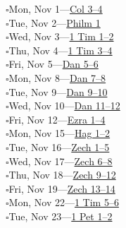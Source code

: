 \hypertarget{rp-2027-11-01}{}\noindent$\square$\enspace Mon, Nov 1\enspace---\enspace \hyperlink{ch-colossians-3}{Col 3--4}\\
\hypertarget{rp-2027-11-02}{}\noindent$\square$\enspace Tue, Nov 2\enspace---\enspace \hyperlink{ch-philemon-1}{Philm 1}\\
\hypertarget{rp-2027-11-03}{}\noindent$\square$\enspace Wed, Nov 3\enspace---\enspace \hyperlink{ch-1timothy-1}{1 Tim 1--2}\\
\hypertarget{rp-2027-11-04}{}\noindent$\square$\enspace Thu, Nov 4\enspace---\enspace \hyperlink{ch-1timothy-3}{1 Tim 3--4}\\
\hypertarget{rp-2027-11-05}{}\noindent$\square$\enspace Fri, Nov 5\enspace---\enspace \hyperlink{ch-daniel-5}{Dan 5--6}\\
\hypertarget{rp-2027-11-08}{}\noindent$\square$\enspace Mon, Nov 8\enspace---\enspace \hyperlink{ch-daniel-7}{Dan 7--8}\\
\hypertarget{rp-2027-11-09}{}\noindent$\square$\enspace Tue, Nov 9\enspace---\enspace \hyperlink{ch-daniel-9}{Dan 9--10}\\
\hypertarget{rp-2027-11-10}{}\noindent$\square$\enspace Wed, Nov 10\enspace---\enspace \hyperlink{ch-daniel-11}{Dan 11--12}\\
\hypertarget{rp-2027-11-12}{}\noindent$\square$\enspace Fri, Nov 12\enspace---\enspace \hyperlink{ch-ezra-1}{Ezra 1--4}\\
\hypertarget{rp-2027-11-15}{}\noindent$\square$\enspace Mon, Nov 15\enspace---\enspace \hyperlink{ch-haggai-1}{Hag 1--2}\\
\hypertarget{rp-2027-11-16}{}\noindent$\square$\enspace Tue, Nov 16\enspace---\enspace \hyperlink{ch-zechariah-1}{Zech 1--5}\\
\hypertarget{rp-2027-11-17}{}\noindent$\square$\enspace Wed, Nov 17\enspace---\enspace \hyperlink{ch-zechariah-6}{Zech 6--8}\\
\hypertarget{rp-2027-11-18}{}\noindent$\square$\enspace Thu, Nov 18\enspace---\enspace \hyperlink{ch-zechariah-9}{Zech 9--12}\\
\hypertarget{rp-2027-11-19}{}\noindent$\square$\enspace Fri, Nov 19\enspace---\enspace \hyperlink{ch-zechariah-13}{Zech 13--14}\\
\hypertarget{rp-2027-11-22}{}\noindent$\square$\enspace Mon, Nov 22\enspace---\enspace \hyperlink{ch-1timothy-5}{1 Tim 5--6}\\
\hypertarget{rp-2027-11-23}{}\noindent$\square$\enspace Tue, Nov 23\enspace---\enspace \hyperlink{ch-1peter-1}{1 Pet 1--2}\\

